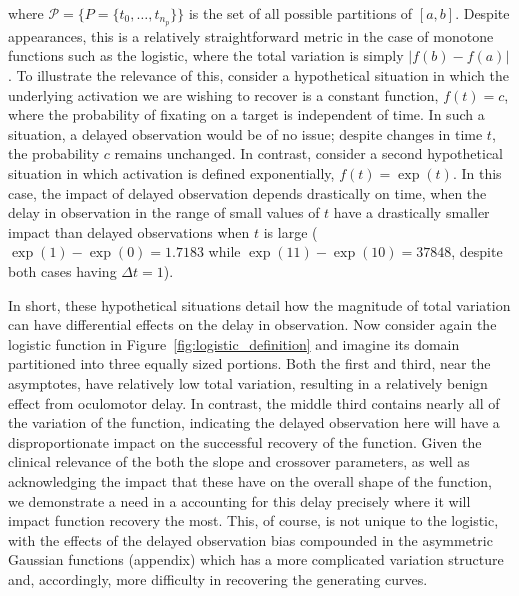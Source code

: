 where $\mathcal{P} = \{P = \{t_0, \dots, t_{n_p}\} \}$ is the set of all possible partitions of $[a,b]$. Despite appearances, this is a relatively straightforward metric in the case of monotone functions such as the logistic, where the total variation is simply $|f(b) - f(a)|$. To illustrate the relevance of this, consider a hypothetical situation in which the underlying activation we are wishing to recover is a constant function, $f(t) = c$, where the probability of fixating on a target is independent of time. In such a situation, a delayed observation would be of no issue; despite changes in time $t$, the probability $c$ remains unchanged. In contrast, consider a second hypothetical situation in which activation is defined exponentially, $f(t) = \exp(t)$. In this case, the impact of delayed observation depends drastically on time, when the delay in observation in the range of small values of $t$ have a drastically smaller impact than delayed observations when $t$ is large ($\exp(1) - \exp(0) = 1.7183$ while $\exp(11) - \exp(10) = 37848$, despite both cases having $\Delta t = 1$).

In short, these hypothetical situations detail how the magnitude of total variation can have differential effects on the delay in observation. Now consider again the logistic function in Figure~\ref{fig:logistic_definition} and imagine its domain partitioned into three equally sized portions. Both the first and third, near the asymptotes, have relatively low total variation, resulting in a relatively benign effect from oculomotor delay. In contrast, the middle third contains nearly all of the variation of the function, indicating the delayed observation here will have a disproportionate impact on the successful recovery of the function. Given the clinical relevance of the both the slope and crossover parameters, as well as acknowledging the impact that these have on the overall shape of the function, we demonstrate a need in a accounting for this delay precisely where it will impact function recovery the most. This, of course, is not unique to the logistic, with the effects of the delayed observation bias compounded in the asymmetric Gaussian functions (appendix) which has a more complicated variation structure and, accordingly, more difficulty in recovering the generating curves.


%





